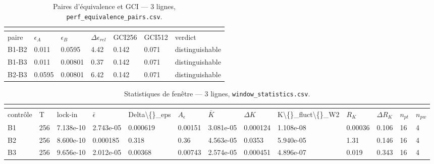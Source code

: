 \documentclass[11pt,a4paper]{article}
\begin{document}
\begin{landscape}
\begingroup\tiny
    \setlength{\tabcolsep}{1.2pt}
    \begin{longtable}{*{7}{l}}
    \caption{Paires d'équivalence et GCI --- 3 lignes, \texttt{perf\_equivalence\_pairs.csv}.}\\
    \label{tab:v2p}\\
    \toprule
    paire & $\epsilon_A$ & $\epsilon_B$ & $\Delta\epsilon_{rel}$ & GCI256 & GCI512 & verdict \\
    \midrule
    \endhead
    \bottomrule
    \endlastfoot
    B1-B2 & 0.011 & 0.0595 & 4.42 & 0.142 & 0.071 & distinguishable \\
    B1-B3 & 0.011 & 0.00801 & 0.37 & 0.142 & 0.071 & distinguishable \\
    B2-B3 & 0.0595 & 0.00801 & 6.42 & 0.142 & 0.071 & distinguishable \\
    \end{longtable}
\endgroup
\end{landscape}


\begin{landscape}
\begingroup\tiny
    \setlength{\tabcolsep}{1.2pt}
    \begin{longtable}{*{13}{l}}
    \caption{Statistiques de fenêtre --- 3 lignes, \texttt{window\_statistics.csv}.}\\
    \label{tab:v3}\\
    \toprule
    contrôle & T & lock-in & $\bar{\epsilon}$ & Delta\textbackslash\{\}\_eps & $A_\epsilon$ & $\bar{K}$ & $\Delta K$ & K\textbackslash\{\}\_fluct\textbackslash\{\}\_W2 & $R_K$ & $\Delta R_K$ & $n_{pt}$ & $n_{pw}$ \\
    \midrule
    \endhead
    \bottomrule
    \endlastfoot
    B1 & 256 & 7.138e-10 & 2.743e-05 & 0.000619 & 0.00151 & 3.081e-05 & 0.000124 & 1.108e-08 & 0.00036 & 0.106 & 16 & 4 \\
    B2 & 256 & 8.600e-10 & 0.000185 & 0.318 & 0.36 & 4.563e-05 & 0.0353 & 5.940e-05 & 1.31 & 0.146 & 16 & 4 \\
    B3 & 256 & 9.656e-10 & 2.012e-05 & 0.00368 & 0.00743 & 2.574e-05 & 0.000451 & 4.896e-07 & 0.019 & 0.343 & 16 & 4 \\
    \end{longtable}
\endgroup
\end{landscape}
\end{document}
